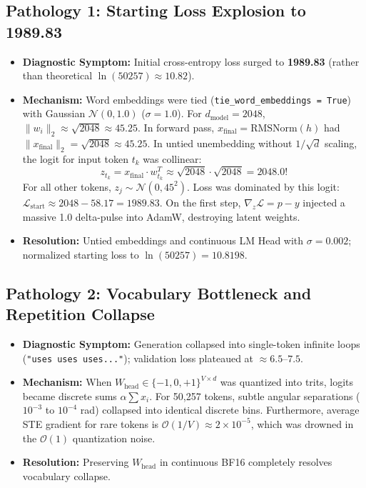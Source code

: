 \documentclass[11pt,a4paper]{article}
\begin{document}
\subsection{Pathology 1: Starting Loss Explosion to 1989.83}
\begin{itemize}
    \item \textbf{Diagnostic Symptom:} Initial cross-entropy loss surged to \textbf{1989.83} (rather than theoretical $\ln(50257) \approx 10.82$).
    \item \textbf{Mechanism:} Word embeddings were tied (\texttt{tie\_word\_embeddings = True}) with Gaussian $\mathcal{N}(0, 1.0)$ ($\sigma = 1.0$). For $d_{\text{model}} = 2048$, $\|w_i\|_2 \approx \sqrt{2048} \approx 45.25$. In forward pass, $x_{\text{final}} = \text{RMSNorm}(h)$ had $\|x_{\text{final}}\|_2 = \sqrt{2048} \approx 45.25$. In untied unembedding without $1/\sqrt{d}$ scaling, the logit for input token $t_k$ was collinear:
    \begin{equation}
    z_{t_k} = x_{\text{final}} \cdot w_{t_k}^T \approx \sqrt{2048} \cdot \sqrt{2048} = \mathbf{2048.0}!
    \end{equation}
    For all other tokens, $z_j \sim \mathcal{N}(0, 45^2)$. Loss was dominated by this logit: $\mathcal{L}_{\text{start}} \approx 2048 - 58.17 = \mathbf{1989.83}$. On the first step, $\nabla_z \mathcal{L} = p - y$ injected a massive 1.0 delta-pulse into AdamW, destroying latent weights.
    \item \textbf{Resolution:} Untied embeddings and continuous LM Head with $\sigma = 0.002$; normalized starting loss to $\ln(50257) = \mathbf{10.8198}$.
\end{itemize}

\subsection{Pathology 2: Vocabulary Bottleneck and Repetition Collapse}
\begin{itemize}
    \item \textbf{Diagnostic Symptom:} Generation collapsed into single-token infinite loops (\texttt{"uses uses uses..."}); validation loss plateaued at $\approx 6.5$--$7.5$.
    \item \textbf{Mechanism:} When $W_{\text{head}} \in \{-1, 0, +1\}^{V \times d}$ was quantized into trits, logits became discrete sums $\alpha \sum x_i$. For 50,257 tokens, subtle angular separations ($10^{-3}$ to $10^{-4}$ rad) collapsed into identical discrete bins. Furthermore, average STE gradient for rare tokens is $\mathcal{O}(1/V) \approx 2 \times 10^{-5}$, which was drowned in the $\mathcal{O}(1)$ quantization noise.
    \item \textbf{Resolution:} Preserving $W_{\text{head}}$ in continuous BF16 completely resolves vocabulary collapse.
\end{itemize}
\end{document}
